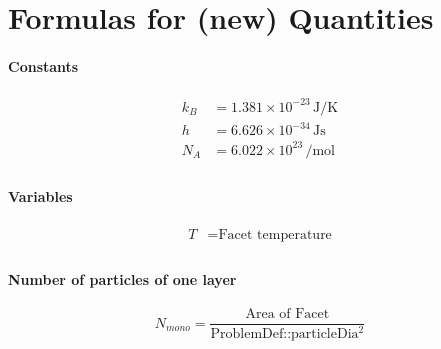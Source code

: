 
\chapter{Formulas for (new) Quantities}\label{chapter:Formulas}

\subsubsection*{Constants}
\begin{equation}
	\begin{split}
	k_B&=1.381\times10^{-23}\,\si{\J \per \K}\\
	h&=6.626\times10^{-34}\,\si{\J \s}\\
	N_A&=6.022\times10^{23}\,\si{\per \mole}\\
	\end{split}
\end{equation}


\subsubsection*{Variables}
\begin{equation}
	\begin{split}
	T&=\text{Facet temperature}\\
	\end{split}
\end{equation}

\subsubsection*{Number of particles of one layer}
\begin{equation}
	\label{eq:nmono}
	N_{mono}=\frac{\text{Area of Facet}}{\text{ProblemDef::particleDia$^2$}}
\end{equation}


